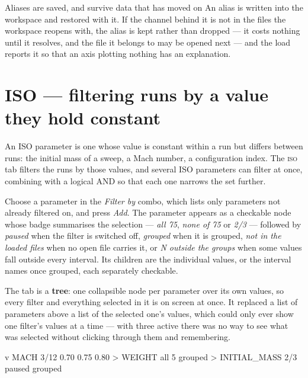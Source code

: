 \documentclass[11pt,a4paper,oneside]{report}
\newcommand{\tab}[1]{\textsc{#1}}
\begin{document}
\begin{aoenote}{Aliases are saved, and survive data that has moved on}
An alias is written into the workspace and restored with it. If the channel
behind it is not in the files the workspace reopens with, the alias is kept
rather than dropped --- it costs nothing until it resolves, and the file it
belongs to may be opened next --- and the load reports it so that an axis
plotting nothing has an explanation.
\end{aoenote}

\section{ISO --- filtering runs by a value they hold constant}
\label{sec:iso}

An ISO parameter is one whose value is constant within a run but differs between
runs: the initial mass of a sweep, a Mach number, a configuration index. The
\tab{iso} tab filters the runs by those values, and several ISO parameters can
filter at once, combining with a logical AND so that each one narrows the set
further.

Choose a parameter in the \emph{Filter by} combo, which lists only parameters not
already filtered on, and press \emph{Add}. The parameter appears as a checkable
node whose badge summarises the selection --- \emph{all 75}, \emph{none of 75} or
\emph{2/3} --- followed by \emph{paused} when the filter is switched off,
\emph{grouped} when it is grouped, \emph{not in the loaded files} when no open
file carries it, or \emph{N outside the groups} when some values fall outside
every interval. Its children are the individual values, or the interval names
once grouped, each separately checkable.

The tab is a \textbf{tree}: one collapsible node per parameter over its own
values, so every filter and everything selected in it is on screen at once. It
replaced a list of parameters above a list of the selected one's values, which
could only ever show one filter's values at a time --- with three active there
was no way to see what was selected without clicking through them and
remembering.

\begin{aoecode}
 v MACH      3/12
     0.70
     0.75
     0.80
 > WEIGHT    all 5   grouped
 > INITIAL_MASS   2/3   paused   grouped
\end{aoecode}
\end{document}
